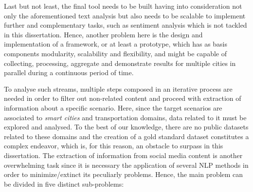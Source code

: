 Last but not least, the final tool needs to be built having into consideration not only the aforementioned text analysis but also needs to be scalable to implement further and complementary tasks, such as sentiment analysis which is not tackled in this dissertation. Hence, another problem here is the design and implementation of a framework, or at least a prototype, which has as basis components modularity, scalability and flexibility, and might be capable of collecting, processing, aggregate and demonstrate results for multiple cities in parallel during a continuous period of time.

\iffalse
The problem on focus in this dissertation is the analysis of a continuous flow of social media streams provided by Twitter. Extracting meaningful and actionable knowledge from such \gls{UGC} is a complex process which we can divide into three main different sub-problems.

First, each social network, Twitter inclusive, has its own particular specificities regarding the data collection methodology. To solve this problem, it is necessary to know which are the targets of the resulting information and which are the methods available in the collecting tools provided by social networks, as well as its limitations.

Second, the volume of data retrieved by such collecting tools is overwhelming and to automatically process and mine these data it is necessary to study what are the most valuable and less time consuming approaches to extract the desired information, useful to entities in the context of Smart Cities and \gls{ITS}.

Finally, the previous mentioned restrictions present in Twitter message (short text, informality, existence of abbreviations, jargon, slang and idioms) require the application of specific \gls{NLP} techniques in order to facilitate the text analysis routines.
\fi

\iffalse
To analyse such streams, multiple steps composed in an iterative process are needed in order to filter out non-related content and proceed with extraction of information about a specific scenario. Here, since the target scenarios are associated to \textit{smart cities} and transportation domains, data related to it must be explored and analysed. To the best of our knowledge, there are no public datasets related to these domains and the creation of a gold standard dataset constitutes a complex endeavor, which is, for this reason, an obstacle to surpass in this dissertation. The extraction of information from social media content is another overwhelming task since it is necessary the application of several \gls{NLP} methods in order to minimize/extinct its peculiarly problems. Hence, the main problem can be divided in five distinct sub-problems:

